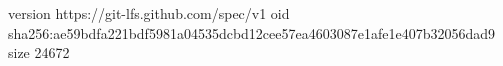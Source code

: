 version https://git-lfs.github.com/spec/v1
oid sha256:ae59bdfa221bdf5981a04535dcbd12cee57ea4603087e1afe1e407b32056dad9
size 24672

